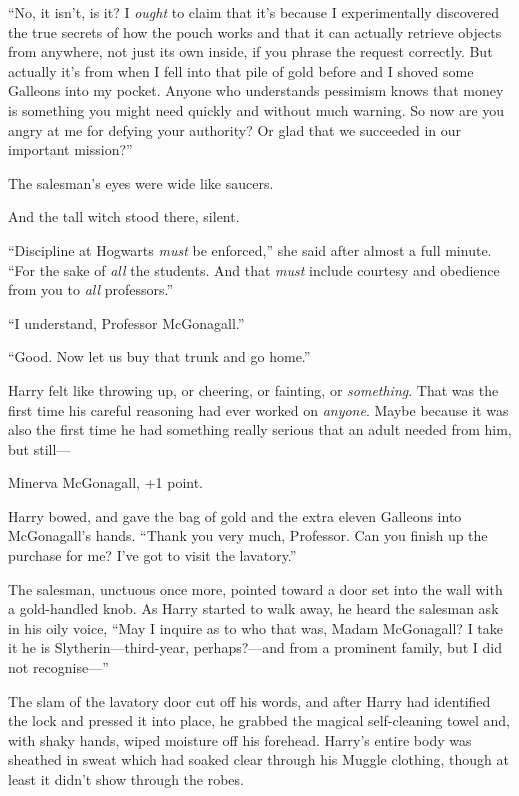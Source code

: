 “No, it isn’t, is it? I \emph{ought} to claim that it’s because I experimentally discovered the true secrets of how the pouch works and that it can actually retrieve objects from anywhere, not just its own inside, if you phrase the request correctly. But actually it’s from when I fell into that pile of gold before and I shoved some Galleons into my pocket. Anyone who understands pessimism knows that money is something you might need quickly and without much warning. So now are you angry at me for defying your authority? Or glad that we succeeded in our important mission?”

The salesman’s eyes were wide like saucers.

And the tall witch stood there, silent.

“Discipline at Hogwarts \emph{must} be enforced,” she said after almost a full minute. “For the sake of \emph{all} the students. And that \emph{must} include courtesy and obedience from you to \emph{all} professors.”

“I understand, Professor McGonagall.”

“Good. Now let us buy that trunk and go home.”

Harry felt like throwing up, or cheering, or fainting, or \emph{something}. That was the first time his careful reasoning had ever worked on \emph{anyone}. Maybe because it was also the first time he had something really serious that an adult needed from him, but still—

Minerva McGonagall, +1 point.

Harry bowed, and gave the bag of gold and the extra eleven Galleons into McGonagall’s hands. “Thank you very much, Professor. Can you finish up the purchase for me? I’ve got to visit the lavatory.”

The salesman, unctuous once more, pointed toward a door set into the wall with a gold-handled knob. As Harry started to walk away, he heard the salesman ask in his oily voice, “May I inquire as to who that was, Madam McGonagall? I take it he is Slytherin—third-year, perhaps?—and from a prominent family, but I did not recognise—”

The slam of the lavatory door cut off his words, and after Harry had identified the lock and pressed it into place, he grabbed the magical self-cleaning towel and, with shaky hands, wiped moisture off his forehead. Harry’s entire body was sheathed in sweat which had soaked clear through his Muggle clothing, though at least it didn’t show through the robes.

